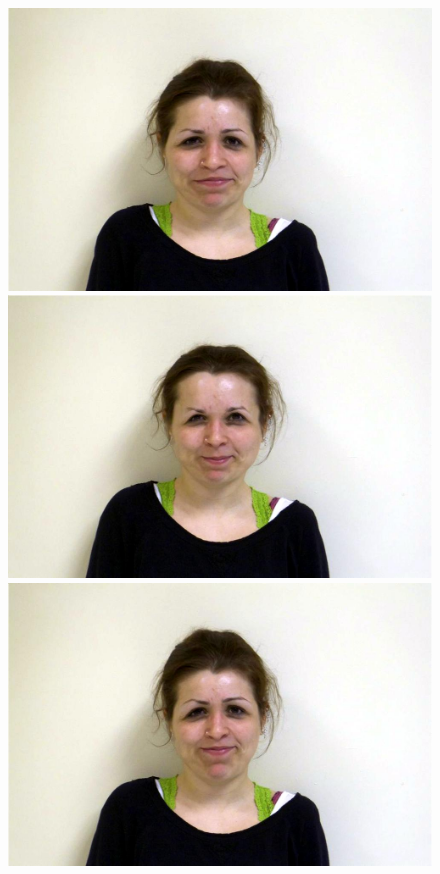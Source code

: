 \documentclass[11pt]{article}
\begin{document}
\begin{figure}[H]
\begin{center}
\includegraphics[scale=0.17]{figs/caricatures/fun_02.jpg}  
\includegraphics[scale=0.17]{figs/caricatures/fun_03.jpg}  
\includegraphics[scale=0.17]{figs/caricatures/fun_04.jpg}  

\end{center}
\end{figure}
\end{document}
